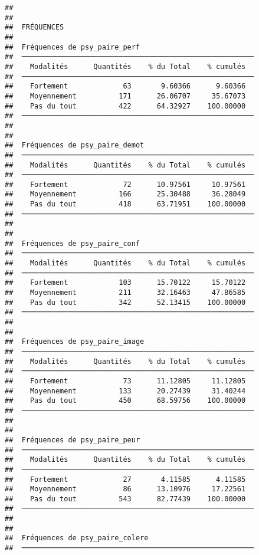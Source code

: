 \documentclass[
]{article}
\begin{document}
\begin{verbatim}
## 
## 
##  FRÉQUENCES
## 
##  Fréquences de psy_paire_perf                            
##  ─────────────────────────────────────────────────────── 
##    Modalités      Quantités    % du Total    % cumulés   
##  ─────────────────────────────────────────────────────── 
##    Fortement             63       9.60366      9.60366   
##    Moyennement          171      26.06707     35.67073   
##    Pas du tout          422      64.32927    100.00000   
##  ─────────────────────────────────────────────────────── 
## 
## 
##  Fréquences de psy_paire_demot                           
##  ─────────────────────────────────────────────────────── 
##    Modalités      Quantités    % du Total    % cumulés   
##  ─────────────────────────────────────────────────────── 
##    Fortement             72      10.97561     10.97561   
##    Moyennement          166      25.30488     36.28049   
##    Pas du tout          418      63.71951    100.00000   
##  ─────────────────────────────────────────────────────── 
## 
## 
##  Fréquences de psy_paire_conf                            
##  ─────────────────────────────────────────────────────── 
##    Modalités      Quantités    % du Total    % cumulés   
##  ─────────────────────────────────────────────────────── 
##    Fortement            103      15.70122     15.70122   
##    Moyennement          211      32.16463     47.86585   
##    Pas du tout          342      52.13415    100.00000   
##  ─────────────────────────────────────────────────────── 
## 
## 
##  Fréquences de psy_paire_image                           
##  ─────────────────────────────────────────────────────── 
##    Modalités      Quantités    % du Total    % cumulés   
##  ─────────────────────────────────────────────────────── 
##    Fortement             73      11.12805     11.12805   
##    Moyennement          133      20.27439     31.40244   
##    Pas du tout          450      68.59756    100.00000   
##  ─────────────────────────────────────────────────────── 
## 
## 
##  Fréquences de psy_paire_peur                            
##  ─────────────────────────────────────────────────────── 
##    Modalités      Quantités    % du Total    % cumulés   
##  ─────────────────────────────────────────────────────── 
##    Fortement             27       4.11585      4.11585   
##    Moyennement           86      13.10976     17.22561   
##    Pas du tout          543      82.77439    100.00000   
##  ─────────────────────────────────────────────────────── 
## 
## 
##  Fréquences de psy_paire_colere                          
##  ─────────────────────────────────────────────────────── 

\end{verbatim}
\end{document}
